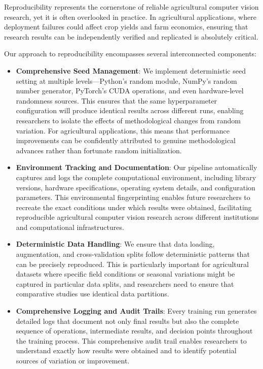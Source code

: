 Reproducibility represents the cornerstone of reliable agricultural computer vision research, yet it is often overlooked in practice. In agricultural applications, where deployment failures could affect crop yields and farm economics, ensuring that research results can be independently verified and replicated is absolutely critical.

Our approach to reproducibility encompasses several interconnected components:

\begin{itemize}
    \item \textbf{Comprehensive Seed Management}: We implement deterministic seed setting at multiple levels—Python's random module, NumPy's random number generator, PyTorch's CUDA operations, and even hardware-level randomness sources. This ensures that the same hyperparameter configuration will produce identical results across different runs, enabling researchers to isolate the effects of methodological changes from random variation. For agricultural applications, this means that performance improvements can be confidently attributed to genuine methodological advances rather than fortunate random initialization.
    
    \item \textbf{Environment Tracking and Documentation}: Our pipeline automatically captures and logs the complete computational environment, including library versions, hardware specifications, operating system details, and configuration parameters. This environmental fingerprinting enables future researchers to recreate the exact conditions under which results were obtained, facilitating reproducible agricultural computer vision research across different institutions and computational infrastructures.
    
    \item \textbf{Deterministic Data Handling}: We ensure that data loading, augmentation, and cross-validation splits follow deterministic patterns that can be precisely reproduced. This is particularly important for agricultural datasets where specific field conditions or seasonal variations might be captured in particular data splits, and researchers need to ensure that comparative studies use identical data partitions.
    
    \item \textbf{Comprehensive Logging and Audit Trails}: Every training run generates detailed logs that document not only final results but also the complete sequence of operations, intermediate results, and decision points throughout the training process. This comprehensive audit trail enables researchers to understand exactly how results were obtained and to identify potential sources of variation or improvement.
\end{itemize}

